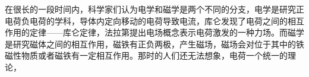 

在很长的一段时间内，科学家们认为电学和磁学是两个不同的分支，电学是研究正电荷负电荷的学科，导体内定向移动的电荷导致电流，库仑发现了电荷之间的相互作用的定律——库仑定律，法拉第提出电场概念表示电荷激发的一种力场。而磁学是研究磁体之间的相互作用，磁铁有正负两极，产生磁场，磁场会对位于其中的铁磁性物质或者磁铁有一定相互作用。那时的人们还无法想象，电荷一个统一的理论，
